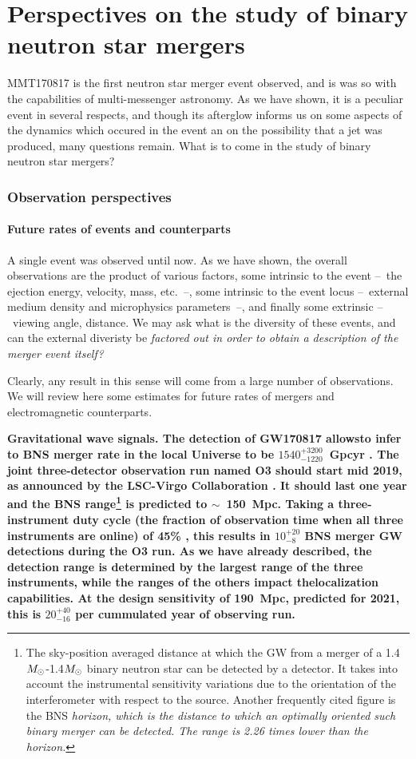 
\part{Perspectives on the study of binary neutron star mergers}

MMT170817 is the first neutron star merger event observed, and is was so with the capabilities of multi-messenger astronomy. As we have shown, it is a peculiar event in several respects, and though its afterglow informs us on some aspects of the dynamics which occured in the event an on the possibility that a jet was produced, many questions remain. What is to come in the study of binary neutron star mergers?

\section{Observation perspectives}
\subsection{Future rates of events and counterparts}

A single event was observed until now. As we have shown, the overall observations are the product of various factors, some intrinsic to the event --~the ejection energy, velocity, mass, etc.~--, some intrinsic to the event locus --~external medium density and microphysics parameters~--, and finally some extrinsic --~viewing angle, distance. We may ask what is the diversity of these events, and can the external diveristy be \it{factored out} in order to obtain a description of the merger event itself?

Clearly, any result in this sense will come from a large number of observations. We will review here some estimates for future rates of mergers and electromagnetic counterparts.

\bf{Gravitational wave signals.} The detection of GW170817 allowsto infer to BNS merger rate in the local Universe to be $1540^{+3200}_{-1220}$~Gpcyr \citep{37}. The joint three-detector observation run named O3 should start mid 2019, as announced by the LSC-Virgo Collaboration \citep{54}. It should last one year and the BNS range\footnote{The sky-position averaged distance at which the GW from a merger of a 1.4$M_{\odot}$-1.4$M_{\odot}$ binary neutron star can be detected by a detector. It takes into account the instrumental sensitivity variations due to the orientation of the interferometer with respect to the source. Another frequently cited figure is the BNS \it{horizon}, which is the distance to which an  optimally oriented such binary merger can be detected. The range is 2.26 times lower than the horizon.} is predicted to $\sim$~150~Mpc. Taking a three-instrument duty cycle (the fraction of observation time when all three instruments are online) of 45\% \citep{54}, this results in $10^{+20}_{-8}$ BNS merger GW detections during the O3 run. As we have already described, the detection range is determined by the largest range of the three instruments, while the ranges of the others impact thelocalization capabilities.
At the design sensitivity of 190~Mpc, predicted for 2021, this is $20^{+40}_{-16}$ per cummulated year of observing run.

